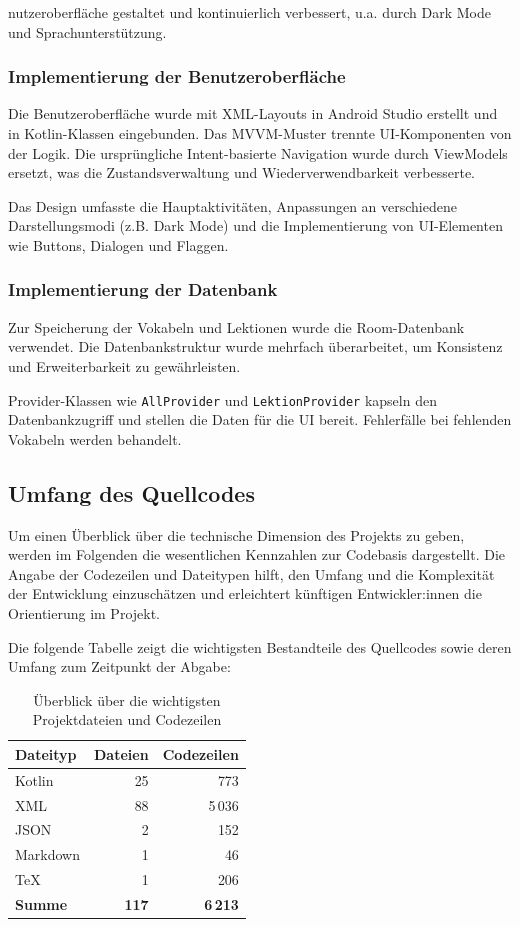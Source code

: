 \documentclass[12pt,a4paper]{article}
\begin{document}
nutzeroberfläche gestaltet und kontinuierlich verbessert, u.a. durch Dark Mode und Sprachunterstützung.

\subsubsection{Implementierung der Benutzeroberfläche}
Die Benutzeroberfläche wurde mit XML-Layouts in Android Studio erstellt und in Kotlin-Klassen eingebunden. Das MVVM-Muster trennte UI-Komponenten von der Logik. Die ursprüngliche Intent-basierte Navigation wurde durch ViewModels ersetzt, was die Zustandsverwaltung und Wiederverwendbarkeit verbesserte.

Das Design umfasste die Hauptaktivitäten, Anpassungen an verschiedene Darstellungsmodi (z.B. Dark Mode) und die Implementierung von UI-Elementen wie Buttons, Dialogen und Flaggen.

\subsubsection{Implementierung der Datenbank}
Zur Speicherung der Vokabeln und Lektionen wurde die Room-Datenbank verwendet. Die Datenbankstruktur wurde mehrfach überarbeitet, um Konsistenz und Erweiterbarkeit zu gewährleisten.

Provider-Klassen wie \texttt{AllProvider} und \texttt{LektionProvider} kapseln den Datenbankzugriff und stellen die Daten für die UI bereit. Fehlerfälle bei fehlenden Vokabeln werden behandelt.

\subsection{Umfang des Quellcodes}

Um einen Überblick über die technische Dimension des Projekts zu geben, werden im Folgenden die wesentlichen Kennzahlen zur Codebasis dargestellt. Die Angabe der Codezeilen und Dateitypen hilft, den Umfang und die Komplexität der Entwicklung einzuschätzen und erleichtert künftigen Entwickler:innen die Orientierung im Projekt.

Die folgende Tabelle zeigt die wichtigsten Bestandteile des Quellcodes sowie deren Umfang zum Zeitpunkt der Abgabe:

\begin{table}[H]
\centering
\caption{Überblick über die wichtigsten Projektdateien und Codezeilen}
\begin{tabular}{lrr}
\toprule
\textbf{Dateityp} & \textbf{Dateien} & \textbf{Codezeilen} \\
\midrule
Kotlin    & 25  & 773 \\
XML       & 88  & 5\,036 \\
JSON      & 2   & 152 \\
Markdown  & 1   & 46 \\
TeX       & 1   & 206 \\
\midrule
\textbf{Summe}   & \textbf{117} & \textbf{6\,213} \\
\bottomrule
\end{tabular}
\end{table}
\end{document}
